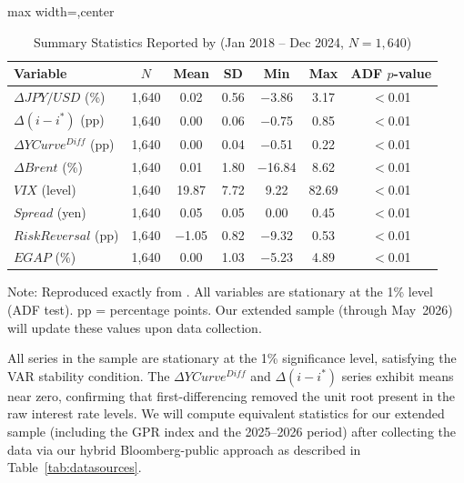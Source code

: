 \documentclass[12pt]{article}
\newenvironment{safetable}[1][\textwidth]{\begin{adjustbox}{max width=#1,center}}{\end{adjustbox}}
\begin{document}
\begin{table}[H]
  \centering
  \begin{safetable}
    \begin{threeparttable}
      \caption{Summary Statistics Reported by \textcite{guyot2026risk} (Jan 2018 -- Dec 2024, $N = 1,\!640$)}
      \label{tab:descriptive}
      \begin{tabular}{lcccccc}
        \toprule
        Variable & $N$ & Mean & SD & Min & Max & ADF $p$-value \\
        \midrule
        $\Delta JPY/USD$ (\%) & 1,640 & 0.02 & 0.56 & $-$3.86 & 3.17 & $<$0.01 \\
        $\Delta(i-i^*)$ (pp) & 1,640 & 0.00 & 0.06 & $-$0.75 & 0.85 & $<$0.01 \\
        $\Delta YCurve^{Diff}$ (pp) & 1,640 & 0.00 & 0.04 & $-$0.51 & 0.22 & $<$0.01 \\
        $\Delta Brent$ (\%) & 1,640 & 0.01 & 1.80 & $-$16.84 & 8.62 & $<$0.01 \\
        $VIX$ (level) & 1,640 & 19.87 & 7.72 & 9.22 & 82.69 & $<$0.01 \\
        $Spread$ (yen) & 1,640 & 0.05 & 0.05 & 0.00 & 0.45 & $<$0.01 \\
        $RiskReversal$ (pp) & 1,640 & $-$1.05 & 0.82 & $-$9.32 & 0.53 & $<$0.01 \\
        $EGAP$ (\%) & 1,640 & 0.00 & 1.03 & $-$5.23 & 4.89 & $<$0.01 \\
        \bottomrule
      \end{tabular}
      \begin{tablenotes}
        \item \footnotesize Note: Reproduced exactly from \textcite[Table~1]{guyot2026risk}. All variables are stationary at the 1\% level (ADF test). pp = percentage points. Our extended sample (through May~2026) will update these values upon data collection.
      \end{tablenotes}
    \end{threeparttable}
  \end{safetable}
\end{table}

{} All series in the \textcite{guyot2026risk} sample are stationary at the 1\% significance level, satisfying the VAR stability condition. The $\Delta YCurve^{Diff}$ and $\Delta(i-i^*)$ series exhibit means near zero, confirming that first-differencing removed the unit root present in the raw interest rate levels. We will compute equivalent statistics for our extended sample (including the GPR index and the 2025--2026 period) after collecting the data via our hybrid Bloomberg-public approach as described in Table~\ref{tab:datasources}.
\end{document}
